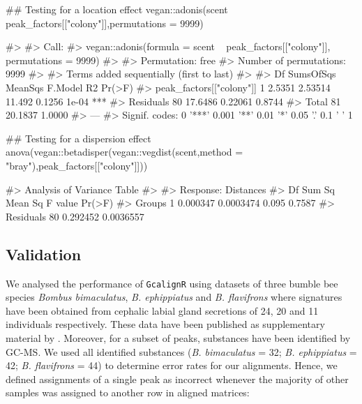 \begin{Schunk}
\begin{Sinput}
## Testing for a location effect
vegan::adonis(scent ~ peak_factors[["colony"]],permutations = 9999)
\end{Sinput}
\begin{Soutput}
#> 
#> Call:
#> vegan::adonis(formula = scent ~ peak_factors[["colony"]], permutations = 9999) 
#> 
#> Permutation: free
#> Number of permutations: 9999
#> 
#> Terms added sequentially (first to last)
#> 
#>                          Df SumsOfSqs MeanSqs F.Model     R2 Pr(>F)    
#> peak_factors[["colony"]]  1    2.5351 2.53514  11.492 0.1256  1e-04 ***
#> Residuals                80   17.6486 0.22061         0.8744           
#> Total                    81   20.1837                 1.0000           
#> ---
#> Signif. codes:  0 '***' 0.001 '**' 0.01 '*' 0.05 '.' 0.1 ' ' 1
\end{Soutput}
\begin{Sinput}
## Testing for a dispersion effect
anova(vegan::betadisper(vegan::vegdist(scent,method = "bray"),peak_factors[["colony"]]))
\end{Sinput}
\begin{Soutput}
#> Analysis of Variance Table
#> 
#> Response: Distances
#>           Df   Sum Sq   Mean Sq F value Pr(>F)
#> Groups     1 0.000347 0.0003474   0.095 0.7587
#> Residuals 80 0.292452 0.0036557
\end{Soutput}
\end{Schunk}

\subsection{Validation}\label{validation}

We analysed the performance of \texttt{GcalignR} using datasets of three
bumble bee species \emph{Bombus bimaculatus}, \emph{B. ephippiatus} and
\emph{B. flavifrons} where signatures have been obtained from cephalic
labial gland secretions of 24, 20 and 11 individuals respectively. These
data have been published as supplementary material by
\citet{Dellicour.2013}. Moreover, for a subset of peaks, substances have
been identified by GC-MS. We used all identified substances (\emph{B.
bimaculatus} = 32; \emph{B. ephippiatus} = 42; \emph{B. flavifrons} =
44) to determine error rates for our alignments. Hence, we defined
assignments of a single peak as incorrect whenever the majority of other
samples was assigned to another row in aligned matrices:

